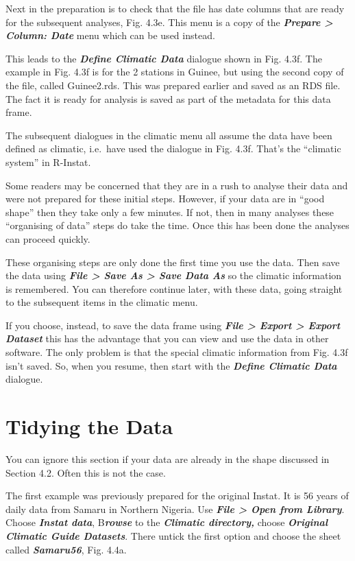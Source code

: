 \documentclass[
  letterpaper,
  DIV=11,
  numbers=noendperiod]{scrreprt}
\begin{document}
Next in the preparation is to check that the file has date columns that
are ready for the subsequent analyses, Fig. 4.3e. This menu is a copy of
the \textbf{\emph{Prepare \textgreater{} Column: Date}} menu which can
be used instead.

This leads to the \textbf{\emph{Define Climatic Data}} dialogue shown in
Fig. 4.3f. The example in Fig. 4.3f is for the 2 stations in Guinee, but
using the second copy of the file, called Guinee2.rds. This was prepared
earlier and saved as an RDS file. The fact it is ready for analysis is
saved as part of the metadata for this data frame.

The subsequent dialogues in the climatic menu all assume the data have
been defined as climatic, i.e.~have used the dialogue in Fig. 4.3f.
That's the ``climatic system'' in R-Instat.

Some readers may be concerned that they are in a rush to analyse their
data and were not prepared for these initial steps. However, if your
data are in ``good shape'' then they take only a few minutes. If not,
then in many analyses these ``organising of data'' steps do take the
time. Once this has been done the analyses can proceed quickly.

These organising steps are only done the first time you use the data.
Then save the data using \textbf{\emph{File \textgreater{} Save As
\textgreater{} Save Data As}} so the climatic information is remembered.
You can therefore continue later, with these data, going straight to the
subsequent items in the climatic menu.

If you choose, instead, to save the data frame using \textbf{\emph{File
\textgreater{} Export \textgreater{} Export Dataset}} this has the
advantage that you can view and use the data in other software. The only
problem is that the special climatic information from Fig. 4.3f isn't
saved. So, when you resume, then start with the \textbf{\emph{Define
Climatic Data}} dialogue.

\section{Tidying the Data}\label{tidying-the-data}

You can ignore this section if your data are already in the shape
discussed in Section 4.2. Often this is not the case.

The first example was previously prepared for the original Instat. It is
56 years of daily data from Samaru in Northern Nigeria. Use
\textbf{\emph{File \textgreater{} Open from Library}}. Choose
\textbf{\emph{Instat data}}, B\textbf{\emph{rowse}} to the
\textbf{\emph{Climatic directory,}} choose \textbf{\emph{Original
Climatic Guide Datasets}}. There untick the first option and choose the
sheet called \textbf{\emph{Samaru56}}, Fig. 4.4a.
\end{document}
